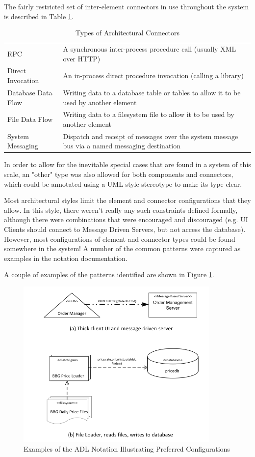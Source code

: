 The fairly restricted set of inter-element connectors in use throughout the system is described in Table \ref{table:archconntypes}.


\begin{table}
\caption{Types of Architectural Connectors}
\label{table:archconntypes}
\footnotesize
\begin{tabular}{l p{10cm}}

RPC                & A synchronous inter-process procedure call (usually XML over HTTP) \\
Direct Invocation  & An in-process direct procedure invocation (calling a library) \\
Database Data Flow & Writing data to a database table or tables to allow it to be used by another element \\
File Data Flow     & Writing data to a filesystem file to allow it to be used by another element \\
System Messaging   &  Dispatch and receipt of messages over the system message bus via a named messaging destination \\
\end{tabular}
\end{table}

  In order to allow for the inevitable special cases that are found in a system of this scale, an "other" type was also allowed for both components and connectors, which could be annotated using a UML style stereotype to make its type clear.

  Most architectural styles limit the element and connector configurations that they allow.  In this style, there weren't really any such constraints defined formally, although there were combinations that were encouraged and discouraged (e.g. UI Clients should connect to Message Driven Servers, but not access the database).  However, most configurations of element and connector types could be found somewhere in the system! A number of the common patterns were captured as examples in the notation documentation.

  A couple of examples of the patterns identified are shown in Figure \ref{figure:adlnotation1}. 

\begin{figure}
\centering
\includegraphics[width=10cm]{Figures/adls-figure1}
\caption{Examples of the ADL Notation Illustrating Preferred Configurations}
\label{figure:adlnotation1}
\end{figure}  

